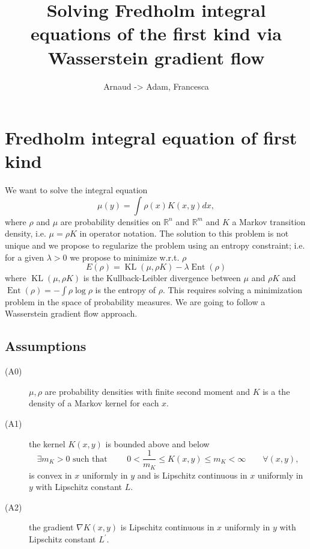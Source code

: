 \documentclass[a4paper]{article}
\title{Solving Fredholm integral equations of the first kind via Wasserstein gradient flow}
\author{Arnaud -> Adam, Francesca }
\date{ }
\theoremstyle{definition}
\DeclareMathOperator{\KL}{KL}
\DeclareMathOperator{\ent}{Ent}
\def\real{\mathbb{R}}
\begin{document}
\maketitle


\graphicspath{{Images/}}

\section{Fredholm integral equation of first kind}

We want to solve the integral equation
\[
\mu(y)=\int\rho\left(x\right)K(x,y)dx,
\]
where $\rho$ and $\mu$ are probability densities on $\real^{n}$ and $\real^{m}$ and $K$ a Markov transition density, i.e. $\mu=\rho K$ in operator notation. The solution to this problem is not unique and we propose to regularize the problem using an entropy constraint; i.e. for a given $\lambda>0$ we propose to minimize w.r.t. $\rho$
\begin{equation}
\label{eq:minimisation}
E(\rho)=\KL(\mu,\rho K)-\lambda\ent(\rho)
\end{equation}
where 
$\KL(\mu,\rho K)$ is the Kullback-Leibler divergence between $\mu$ and $\rho K$ and $\ent(\rho)=-\int\rho\log\rho$ is the entropy of $\rho$.
This requires solving a minimization problem in the space of probability measures. We are going to follow a Wasserstein gradient flow approach.

\subsection{Assumptions}
\begin{description}
\item[(A0) \label{a}] $\mu, \rho$ are probability densities with finite second moment and $K$ is a the density of a Markov kernel for each $x$.
\item[(A1)\label{a:k}] the kernel $K(x, y)$ is bounded above and below
\begin{equation*}
 \exists m_K>0 \text{ such that }\qquad 0<  \frac{1}{m_K} \leq  K(x, y)\leq m_K < \infty \qquad \forall (x, y),
\end{equation*}
is convex in $x$ uniformly in $y$ and is Lipschitz continuous in $x$ uniformly in $y$ with Lipschitz constant $L$.
\item[(A2)\label{a:gradientk}] the gradient $\nabla K(x, y)$ is Lipschitz continuous in $x$ uniformly in $y$ with Lipschitz constant $L^\prime$.
\end{description}
\end{document}
